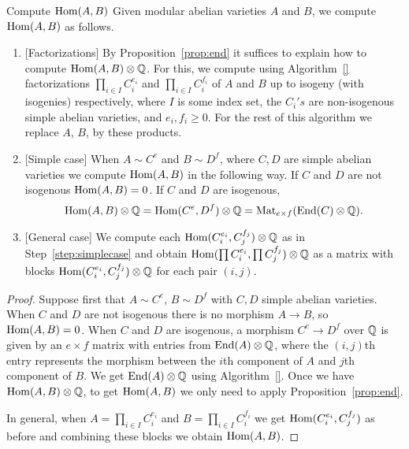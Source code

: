\documentclass{article}
\begin{document}
\begin{algorithm}{Compute $\operatorname{Hom}(A,B)$}
	Given  modular abelian varieties $A$ and $B$, we
	compute $\operatorname{Hom}(A,B)$ as follows.
	\begin{enumerate}
		\item{} [Factorizations]
		      By Proposition~\ref{prop:end} it suffices to explain how
		      to compute $\operatorname{Hom}(A,B)\otimes \mathbb{Q}$.
		      For this, we compute using Algorithm~\ref{}
		      factorizations $\prod_{i \in I} C_i^{e_i}$ and $\prod_{i \in I}
			      C_i^{f_i}$ of $A$ and $B$ up to isogeny (with isogenies)
		      respectively, where $I$ is some index set,
		      the $C_i's$ are non-isogenous simple abelian varieties, and $e_i,
			      f_i \geq 0$.  For the rest of this algorithm
		      we replace $A$, $B$, by these products.
		\item{} [Simple case]\label{step:simplecase} When $A \sim C^e$ and $B \sim D^f$, where $C, D$ are simple
		      abelian varieties we compute $\operatorname{Hom}(A,B)$ in the following way. If $C$ and
		      $D$ are not isogenous $\operatorname{Hom}(A,B) = 0$. If $C$ and $D$ are isogenous,
		      $$
			      \operatorname{Hom}(A,B)\otimes\mathbb{Q} = \operatorname{Hom}(C^e, D^f) \otimes \mathbb{Q} = \operatorname{Mat}_{e \times f} (\operatorname{End}(C) \otimes \mathbb{Q}).
		      $$
		\item{} [General case] We compute each $\operatorname{Hom}(C_i^{e_i}, C_j^{f_j})\otimes\mathbb{Q}$ as in Step~\ref{step:simplecase}
		      and obtain $\operatorname{Hom}(\prod C_i^{e_i}, \prod C_j^{f_j})\otimes\mathbb{Q}$ as a
		      matrix with blocks $\operatorname{Hom}(C_i^{e_i},C_j^{f_j})\otimes\mathbb{Q}$ for each pair $(i,j)$.
	\end{enumerate}
\end{algorithm}
\begin{proof}
	Suppose first that $A \sim C^e$, $B \sim D^f$ with $C,D$ simple abelian varieties.
	When $C$ and $D$ are not isogenous there is no morphism $A \to B$, so
	$\operatorname{Hom}(A,B) =  0$. When $C$ and $D$ are isogenous, a morphism $C^e \to D^f$
	over $\mathbb{Q}$ is given by an $e \times f$ matrix with entries from $\operatorname{End}(A) \otimes
		\mathbb{Q}$, where the $(i,j)$th entry represents the morphism between the $i$th
	component of $A$ and $j$th component of $B$. We get $\operatorname{End}(A) \otimes \mathbb{Q}$
	using Algorithm~\ref{}. Once we have $\operatorname{Hom}(A,B)
		\otimes \mathbb{Q}$, to get $\operatorname{Hom}(A,B)$ we only need to apply Proposition~\ref{prop:end}.

	In general, when $A = \prod_{i \in I} C_i^{e_i}$ and $B = \prod_{i \in I}
		C_i^{f_i}$ we get $\operatorname{Hom}(C_i^{e_i}, C_j^{f_j})$ as before and combining these
	blocks we obtain $\operatorname{Hom}(A,B)$.
\end{proof}
\end{document}
